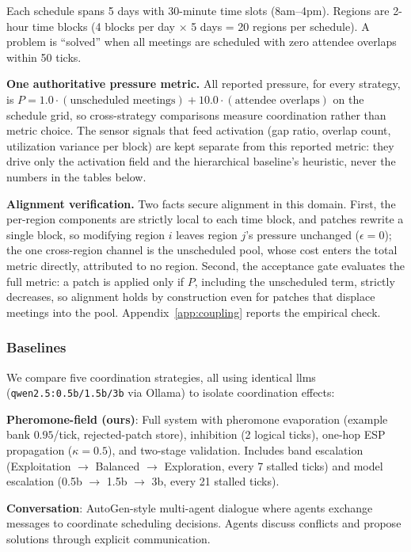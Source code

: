Each schedule spans 5 days with 30-minute time slots (8am--4pm). Regions are 2-hour time blocks (4 blocks per day $\times$ 5 days = 20 regions per schedule). A problem is ``solved'' when all meetings are scheduled with zero attendee overlaps within 50 ticks.

\textbf{One authoritative pressure metric.} All reported pressure, for every strategy, is $P = 1.0 \cdot (\text{unscheduled meetings}) + 10.0 \cdot (\text{attendee overlaps})$ on the schedule grid, so cross-strategy comparisons measure coordination rather than metric choice. The sensor signals that feed activation (gap ratio, overlap count, utilization variance per block) are kept separate from this reported metric: they drive only the activation field and the hierarchical baseline's heuristic, never the numbers in the tables below.

\textbf{Alignment verification.} Two facts secure alignment in this domain. First, the per-region components are strictly local to each time block, and patches rewrite a single block, so modifying region $i$ leaves region $j$'s pressure unchanged ($\epsilon = 0$); the one cross-region channel is the unscheduled pool, whose cost enters the total metric directly, attributed to no region. Second, the acceptance gate evaluates the full metric: a patch is applied only if $P$, including the unscheduled term, strictly decreases, so alignment holds by construction even for patches that displace meetings into the pool. Appendix~\ref{app:coupling} reports the empirical check.

\subsubsection{Baselines}

We compare five coordination strategies, all using identical \acp{llm} (\texttt{qwen2.5:0.5b/1.5b/3b} via Ollama) to isolate coordination effects:

\textbf{Pheromone-field (ours)}: Full system with pheromone evaporation (example bank $0.95$/tick, rejected-patch store), inhibition (2 logical ticks), one-hop ESP propagation ($\kappa = 0.5$), and two-stage validation. Includes band escalation (Exploitation $\to$ Balanced $\to$ Exploration, every 7 stalled ticks) and model escalation (0.5b $\to$ 1.5b $\to$ 3b, every 21 stalled ticks).

\textbf{Conversation}: AutoGen-style multi-agent dialogue where agents exchange messages to coordinate scheduling decisions. Agents discuss conflicts and propose solutions through explicit communication.

